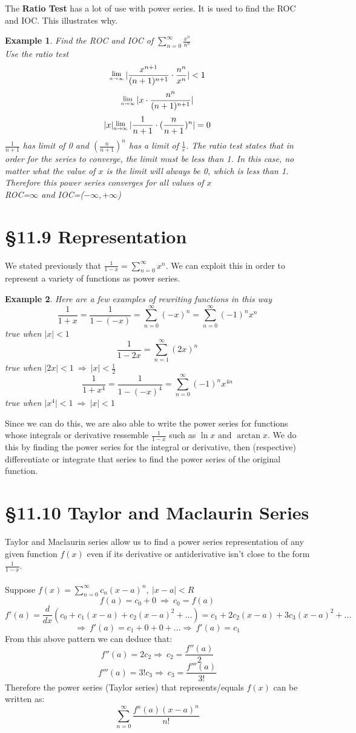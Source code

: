 \documentclass[12 pt]{article}
\newcommand{\Lim}[1]{\raisebox{0.5ex}{\scalebox{0.8}{$\displaystyle \lim_{#1}\;$}}}
\newcommand{\sumz}{\sum\limits_{n=0}^{\infty}}
\newcommand{\sumo}{\sum\limits_{n=1}^{\infty}}
\newcommand{\toinfty}{\rightarrow\infty}
\newtheorem*{exmp*}{Example}
\begin{document}
		The \textbf{Ratio Test} has a lot of use with power series. It is used to find the ROC and IOC. This illustrates why.
		\begin{exmp*}
			Find the ROC and IOC of $\sumz \frac{x^n}{n^n}$\\
			Use the ratio test\\
			$$\Lim{n\toinfty} \lvert\frac{x^{n+1}}{(n+1)^{n+1}}\cdot\frac{n^n}{x^n}\rvert<1$$
			$$\Lim{n\toinfty}\lvert x\cdot\frac{n^n}{(n+1)^{n+1}}\rvert$$
			$$\lvert x\rvert\Lim{n\toinfty}\lvert\frac{1}{n+1}\cdot(\frac{n}{n+1})^n\rvert=0$$
			$\frac{1}{n+1}$ has limit of 0 and $(\frac{n}{n+1})^n$ has a limit of $\frac{1}{e}$. The ratio test states that in order for the series to converge, the limit must be less than 1. In this case, no matter what the value of $x$ is the limit will always be 0, which is less than 1. Therefore this power series converges for all values of $x$\\
			ROC=$\infty$ and IOC=($-\infty, +\infty$)
		\end{exmp*}
	\section{\S 11.9 Representation}
		We stated previously that $\frac{1}{1-x}=\sumz x^n$. We can exploit this in order to represent a variety of functions as power series.
		\begin{exmp*}
			Here are a few examples of rewriting functions in this way
			$$\frac{1}{1+x}=\frac{1}{1-(-x)}=\sumz (-x)^n=\sumz (-1)^nx^n$$
			true when $\lvert x\rvert<1$
			$$\frac{1}{1-2x}=\sumo (2x)^n$$
			true when $\lvert 2x\rvert<1\ \Rightarrow \ \lvert x\rvert<\frac{1}{2}$
			$$\frac{1}{1+x^4}=\frac{1}{1-(-x)^4}=\sumz (-1)^nx^{4n}$$
			true when $\lvert x^4\rvert<1\ \Rightarrow \ \lvert x\rvert<1$
		\end{exmp*}
		Since we can do this, we are also able to write the power series for functions whose integrals or derivative ressemble $\frac{1}{1-x}$ such as $\ln{x}$ and $\arctan{x}$. We do this by finding the power series for the integral or derivative, then (respective) differentiate or integrate that series to find the power series of the original function.
	\section{\S 11.10 Taylor and Maclaurin Series}
		Taylor and Maclaurin series allow us to find a power series representation of any given function $f(x)$ even if its derivative or antiderivative isn't close to the form $\frac{1}{1-x}$.\\\\
		Suppose $f(x)=\sumz c_n(x-a)^n,\ \left|x-a\right|<R$
		$$f(a)=c_0+0\ \Rightarrow\ c_0=f(a)$$
		$$f'(a)=\frac{d}{dx}(c_0+c_1(x-a)+c_2(x-a)^2+...)=c_1+2c_2(x-a)+3c_3(x-a)^2+...$$
		$$\Rightarrow\ f'(a)=c_1+0+0+...\Rightarrow\ f'(a)=c_1$$
		From this above pattern we can deduce that:
		$$f''(a)=2c_2\Rightarrow\ c_2=\frac{f''(a)}{2}$$
		$$f'''(a)=3!c_3\Rightarrow\ c_3=\frac{f'''(a)}{3!}$$
		Therefore the power series (Taylor series) that represents/equals $f(x)$ can be written as:
		$$\sumz \frac{f^n(a)(x-a)^n}{n!}$$
\end{document}
